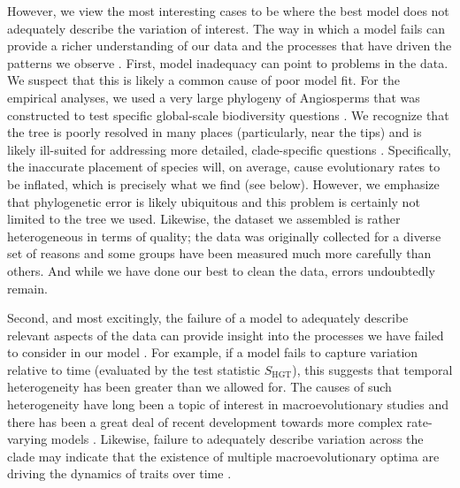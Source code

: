 However, we view the most interesting cases to be where the best model does not adequately describe the variation of interest. The way in which a model fails can provide a richer understanding of our data and the processes that have driven the patterns we observe \citep{Gelman2012}. First, model inadequacy can point to problems in the data. We suspect that this is likely a common cause of poor model fit. For the empirical analyses, we used a very large phylogeny of Angiosperms that was constructed to test specific global-scale biodiversity questions \citep{Zanne2013}. We recognize that the tree is poorly resolved in many places (particularly, near the tips) and is likely ill-suited for addressing more detailed, clade-specific questions \citep[see the recent critique by][]{DonoghueEdwards}. Specifically, the inaccurate placement of species will, on average, cause evolutionary rates to be inflated, which is precisely what we find (see below). However, we emphasize that phylogenetic error is likely ubiquitous and this problem is certainly not limited to the tree we used. Likewise, the dataset we assembled is rather heterogeneous in terms of quality; the data was originally collected for a diverse set of reasons and some groups have been measured much more carefully than others. And while we have done our best to clean the data, errors undoubtedly remain. 

Second, and most excitingly, the failure of a model to adequately describe relevant aspects of the data can provide insight into the processes we have failed to consider in our model \citep{Gelman2012}. For example, if a model fails to capture variation relative to time (evaluated by the test statistic $S_{\text{HGT}}$), this suggests that temporal heterogeneity has been greater than we allowed for. The causes of such heterogeneity have long been a topic of interest in macroevolutionary studies \citep[e.g.,][]{Simpson1944, Foote1997} and there has been a great deal of recent development towards more complex rate-varying models \citep[e.g.,][]{Omeara2006, Thomas2006, Eastman2011, Weir2012, RaboskyBAMM}. Likewise, failure to adequately describe variation across the clade may indicate that the existence of multiple macroevolutionary optima \citep[sensu][]{Hansen2012book} are driving the dynamics of traits over time \citep[see][for models that have been used to capture these dynamics]{Hansen1997, ButlerKing2004, Beaulieu2012, IngramMahler2013, UyedaBayou}. 

